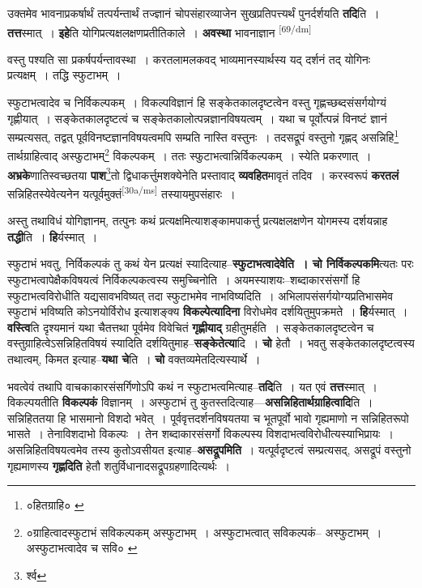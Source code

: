 \documentclass[article,12pt,a4paper]{memoir}
\begin{document}
	  \pstart उक्तमेव भावनाप्रकर्षार्थं तत्पर्यन्तार्थं तज्ज्ञानं चोपसंहारव्याजेन सुखप्रतिपत्त्यर्थं पुनर्दर्शयति \textbf{तदि}ति । \textbf{तत्त}स्मात् । \textbf{इहे}ति योगिप्रत्यक्षलक्षणप्रतीतिकाले । \textbf{अवस्था} भावनाज्ञान  \leavevmode\textsuperscript{\rmlatinfont\tiny [69/dm]} 
	  
	वस्तु पश्यति सा प्रकर्षपर्यन्तावस्था । करतलामलकवद् भाव्यमानस्यार्थस्य यद् दर्शनं तद् योगिनः प्रत्यक्षम् । तद्धि स्फुटाभम् । 
	  
	स्फुटाभत्वादेव च निर्विकल्पकम् । विकल्पविज्ञानं हि सङ्केतकालदृष्टत्वेन वस्तु गृह्णच्छब्दसंसर्गयोग्यं गृह्णीयात् । सङ्केतकालदृष्टत्वं च सङ्केतकालोत्पन्नज्ञानविषयत्वम् । यथा च पूर्वोत्पन्नं विनष्टं ज्ञानं सम्प्रत्यसत्, तद्वत् पूर्वविनष्टज्ञानविषयत्वमपि सम्प्रति नास्ति वस्तुनः । तदसद्रूपं वस्तुनो गृह्णद् असन्निहि\footnote{०हितग्राहि० \cite{dp-msB} \cite{dp-msC}} तार्थग्राहित्वाद् अस्फुटाभम्\footnote{०ग्राहित्वादस्फुटाभं सविकल्पकम् \cite{dp-msC} अस्फुटाभम् । अस्फुटाभत्वात् सविकल्पकं--\cite{dp-msA} \cite{dp-edP} अस्फुटाभम् । अस्फुटाभत्वादेव च सवि० \cite{dp-msD} \cite{dp-msB} \cite{dp-edH} \cite{dp-edE} \cite{dp-edN}} विकल्पकम् । ततः स्फुटाभत्वान्निर्विकल्पकम् । स्येति प्रकरणात् । \textbf{अभ्रके}णातिस्वच्छतया \textbf{पाश}\footnote{र्श्व}तो द्विधाकर्त्तुमशक्येनेति प्रस्तावाद् \textbf{व्यवहित}मावृतं तदिव । करस्वरूपं \textbf{करतलं} सन्निहितस्येवेत्यनेन यत्पूर्वमुक्तं\leavevmode\textsuperscript{\rmlatinfont\tiny [30a/ms]} तस्यायमुपसंहारः ।
	\pend
      

	  \pstart अस्तु तथाविधं योगिज्ञानम्, तत्पुनः कथं प्रत्यक्षमित्याशङ्कामपाकर्त्तु प्रत्यक्षलक्षणेन योगमस्य दर्शयन्नाह \textbf{तद्धी}ति । \textbf{हि}र्यस्मात् ।
	\pend
      

	  \pstart स्फुटाभं भवतु, निर्विकल्पकं तु कथं येन प्रत्यक्षं स्यादित्याह--\textbf{स्फुटाभत्वादेवेति । चो निर्विकल्पकमि}त्यतः परः स्फुटाभत्वापेक्षैकविषयत्वं निर्विकल्पकत्वस्य समुच्चिनोति । अयमस्याशयः--शब्दाकारसंसर्गो हि स्फुटाभत्वविरोधीति यद्यसावभविष्यत् तदा स्फुटाभमेव नाभविष्यदिति । अभिलापसंसर्गयोग्यप्रतिभासमेव स्फुटाभं भविष्यति कोऽनयोर्विरोध इत्याशङ्क्य \textbf{विकल्पेत्यादिना} विरोधमेव दर्शयितुमुपक्रमते । \textbf{हि}र्यस्मात् । \textbf{वस्त्वि}ति दृश्यमानं यथा चैतत्तथा पूर्वमेव विवेचितं \textbf{गृह्णीयाद्} ग्रहीतुमर्हति । सङ्केतकालदृष्टत्वेन च वस्तुग्राहित्वेऽसन्निहितविषयं स्यादिति दर्शयितुमाह--\textbf{सङ्केतेत्या}दि । \textbf{चो} हेतौ । भवतु सङ्केतकालदृष्टत्वस्य तथात्वम्, किमत इत्याह--\textbf{यथा चे}ति । \textbf{चो} वक्तव्यमेतदित्यस्यार्थे ।
	\pend
      

	  \pstart भवत्वेवं तथापि वाचकाकारसंसर्गिणोऽपि कथं न स्फुटाभत्वमित्याह--\textbf{तदि}ति । यत एवं \textbf{तत्त}स्मात् । विकल्पयतीति \textbf{विकल्पकं} विज्ञानम् । अस्फुटाभं तु कुतस्तदित्याह—\textbf{असन्निहितार्थग्राहित्वादि}ति । सन्निहिततया हि भासमानो विशदो भवेत् । पूर्ववृत्तदर्शनविषयतया च भूतपूर्वो भावो गृह्यमाणो न सन्निहितरूपो भासते । तेनाविशदाभो विकल्पः । तेन शब्दाकारसंसर्गो विकल्पस्य विशदाभत्वविरोधीत्यस्याभिप्रायः । असन्निहितविषयत्वमेव तस्य कुतोऽवसीयत इत्याह--\textbf{असद्रूपमिति} । यत्पूर्वदृष्टत्वं सम्प्रत्यसद्, असद्रूपं वस्तुनो गृह्यमाणस्य \textbf{गृह्णदिति} हेतौ शतुर्विधानादसद्रूपग्रहणादित्यर्थः ।
	\pend
      
\end{document}
